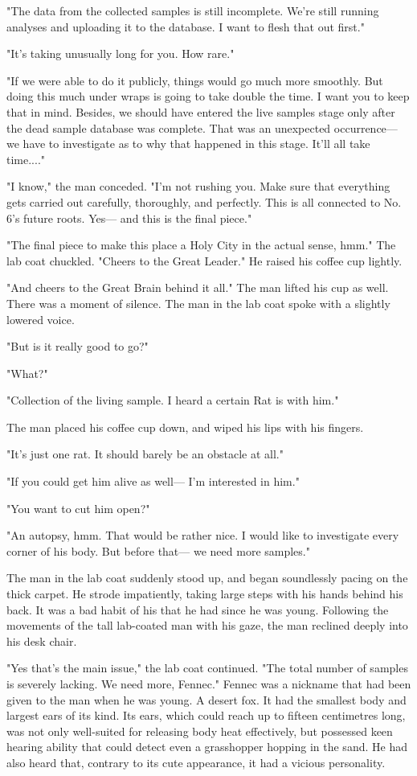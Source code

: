 "The data from the collected samples is still incomplete. We're still
running analyses and uploading it to the database. I want to flesh that
out first."

"It's taking unusually long for you. How rare."

"If we were able to do it publicly, things would go much more smoothly.
But doing this much under wraps is going to take double the time. I want
you to keep that in mind. Besides, we should have entered the live
samples stage only after the dead sample database was complete. That was
an unexpected occurrence--- we have to investigate as to why that happened
in this stage. It'll all take time...."

"I know," the man conceded. "I'm not rushing you. Make sure that
everything gets carried out carefully, thoroughly, and perfectly. This
is all connected to No. 6's future roots. Yes--- and this is the final
piece."

"The final piece to make this place a Holy City in the actual sense,
hmm." The lab coat chuckled. "Cheers to the Great Leader." He raised his
coffee cup lightly.

"And cheers to the Great Brain behind it all." The man lifted his cup as
well. There was a moment of silence. The man in the lab coat spoke with
a slightly lowered voice.

"But is it really good to go?"

"What?"

"Collection of the living sample. I heard a certain Rat is with him."

The man placed his coffee cup down, and wiped his lips with his fingers.

"It's just one rat. It should barely be an obstacle at all."

"If you could get him alive as well--- I'm interested in him."

"You want to cut him open?"

"An autopsy, hmm. That would be rather nice. I would like to investigate
every corner of his body. But before that--- we need more samples."

The man in the lab coat suddenly stood up, and began soundlessly pacing
on the thick carpet. He strode impatiently, taking large steps with his
hands behind his back. It was a bad habit of his that he had since he
was young. Following the movements of the tall lab-coated man with his
gaze, the man reclined deeply into his desk chair.

"Yes that's the main issue," the lab coat continued. "The total number
of samples is severely lacking. We need more, Fennec." Fennec was a
nickname that had been given to the man when he was young. A desert fox.
It had the smallest body and largest ears of its kind. Its ears, which
could reach up to fifteen centimetres long, was not only well-suited for
releasing body heat effectively, but possessed keen hearing ability that
could detect even a grasshopper hopping in the sand. He had also heard
that, contrary to its cute appearance, it had a vicious personality.

